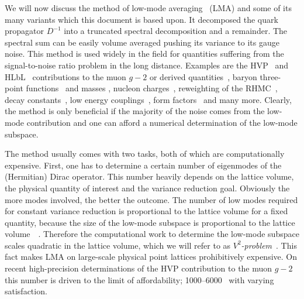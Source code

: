 We will now discuss the method of low-mode averaging~\cite{Neff_2001,DeGrand_2004,Giusti_2004,} (LMA) and some of its many variants which this document is based upon.
It decomposed the quark propagator $D^{-1}$ into a truncated spectral decomposition and a remainder.
The spectral sum can be easily volume averaged pushing its variance to its gauge noise.
This method is used widely in the field for quantities suffering from the signal-to-noise ratio problem in the long distance.
Examples are the HVP~\cite{bmw_2024,Kuberski_2023,Aubin:2022hgm,Bazavov:2024eou,RBC_2024} and HLbL~\cite{Lin:2024khg} contributions to the muon $g-2$ or derived quantities~\cite{ExtendedTwistedMass:2025tpc}, baryon three-point functions~\cite{Yang:2015zja,Ohki:2012jyg} and masses \cite{Bali:2010se}, nucleon charges~\cite{Yamanaka:2018uud}, reweighting of the RHMC~\cite{Kuberski:2023zky}, decay constants~\cite{Bali:2014pva}, low energy couplings~\cite{Bernardoni:2011kd}, form factors~\cite{JLQCD:2009ofg} and many more.
Clearly, the method is only beneficial if the majority of the noise comes from the low-mode contribution and one can afford a numerical determination of the low-mode subspace.

The method usually comes with two tasks, both of which are computationally expensive.
First, one has to determine a certain number of eigenmodes of the (Hermitian) Dirac operator.
This number heavily depends on the lattice volume, the physical quantity of interest and the variance reduction goal.
Obviously the more modes involved, the better the outcome.
The number of low modes required for constant variance reduction is proportional to the lattice volume for a fixed quantity, because the size of the low-mode subspace is proportional to the lattice volume~~\cite{banks1980}.
Therefore the computational work to determine the low-mode subspace scales quadratic in the lattice volume, which we will refer to as \emph{$V^{2}$-problem}~\cite{Luescher2007}.
This fact makes LMA on large-scale physical point lattices prohibitively expensive.
On recent high-precision determinations of the HVP contribution to the muon $g-2$ this number is driven to the limit of affordability; \numrange{1000}{6000}~\cite{Djukanovic:2024cmq,RBC_2024,bmw_2024,Aubin:2022hgm} with varying satisfaction.

